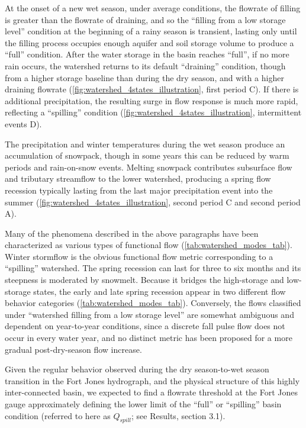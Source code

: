 \documentclass[hess, manuscript]{copernicus}
\begin{document}
At the onset of a new wet season, under average conditions, the flowrate
of filling is greater than the flowrate of draining, and so the
``filling from a low storage level'' condition at the beginning of a
rainy season is transient, lasting only until the filling process
occupies enough aquifer and soil storage volume to produce a ``full''
condition. After the water storage in the basin reaches ``full'', if no
more rain occurs, the watershed returns to its default ``draining''
condition, though from a higher storage baseline than during the dry
season, and with a higher draining flowrate
(\autoref{fig:watershed_4states_illustration}, first period C). If there
is additional precipitation, the resulting surge in flow response is
much more rapid, reflecting a ``spilling'' condition
(\autoref{fig:watershed_4states_illustration}, intermittent events D).

The precipitation and winter temperatures during the wet season produce
an accumulation of snowpack, though in some years this can be reduced by
warm periods and rain-on-snow events. Melting snowpack contributes
subsurface flow and tributary streamflow to the lower watershed,
producing a spring flow recession typically lasting from the last major
precipitation event into the summer
(\autoref{fig:watershed_4states_illustration}, second period C and
second period A).

Many of the phenomena described in the above paragraphs have been
characterized as various types of functional flow
(\autoref{tab:watershed_modes_tab}). Winter stormflow is the obvious
functional flow metric corresponding to a ``spilling'' watershed. The
spring recession can last for three to six months and its steepness is
moderated by snowmelt. Because it bridges the high-storage and
low-storage states, the early and late spring recession appear in two
different flow behavior categories (\autoref{tab:watershed_modes_tab}).
Conversely, the flows classified under ``watershed filling from a low
storage level'' are somewhat ambiguous and dependent on year-to-year
conditions, since a discrete fall pulse flow does not occur in every
water year, and no distinct metric has been proposed for a more gradual
post-dry-season flow increase.

Given the regular behavior observed during the dry season-to-wet season
transition in the Fort Jones hydrograph, and the physical structure of
this highly inter-connected basin, we expected to find a flowrate
threshold at the Fort Jones gauge approximately defining the lower limit
of the ``full'' or ``spilling'' basin condition (referred to here as
\(Q_{spill}\); see Results, section 3.1).
\end{document}
